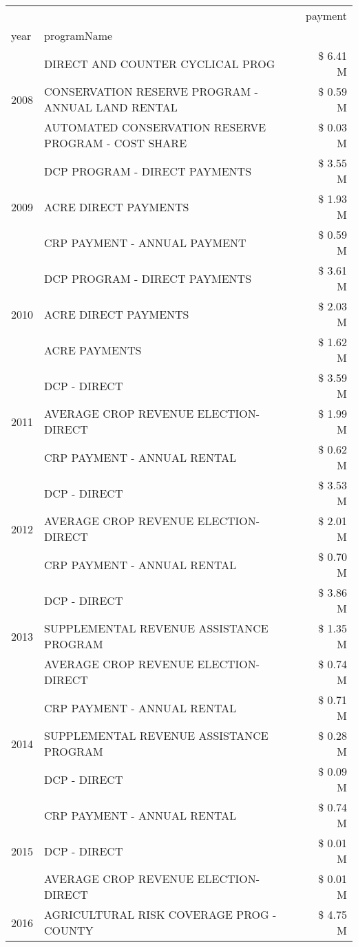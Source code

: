\begin{tabular}{llr}
\toprule
 &  & payment \\
year & programName &  \\
\midrule
\multirow[t]{3}{*}{2008} & DIRECT AND COUNTER CYCLICAL PROG & \$ 6.41 M \\
 & CONSERVATION RESERVE PROGRAM - ANNUAL LAND RENTAL & \$ 0.59 M \\
 & AUTOMATED CONSERVATION RESERVE PROGRAM - COST SHARE & \$ 0.03 M \\
\cline{1-3}
\multirow[t]{3}{*}{2009} & DCP PROGRAM - DIRECT PAYMENTS & \$ 3.55 M \\
 & ACRE DIRECT PAYMENTS & \$ 1.93 M \\
 & CRP PAYMENT - ANNUAL PAYMENT & \$ 0.59 M \\
\cline{1-3}
\multirow[t]{3}{*}{2010} & DCP PROGRAM - DIRECT PAYMENTS & \$ 3.61 M \\
 & ACRE DIRECT PAYMENTS & \$ 2.03 M \\
 & ACRE PAYMENTS & \$ 1.62 M \\
\cline{1-3}
\multirow[t]{3}{*}{2011} & DCP - DIRECT & \$ 3.59 M \\
 & AVERAGE CROP REVENUE ELECTION-DIRECT & \$ 1.99 M \\
 & CRP PAYMENT - ANNUAL RENTAL & \$ 0.62 M \\
\cline{1-3}
\multirow[t]{3}{*}{2012} & DCP - DIRECT & \$ 3.53 M \\
 & AVERAGE CROP REVENUE ELECTION-DIRECT & \$ 2.01 M \\
 & CRP PAYMENT - ANNUAL RENTAL & \$ 0.70 M \\
\cline{1-3}
\multirow[t]{3}{*}{2013} & DCP - DIRECT & \$ 3.86 M \\
 & SUPPLEMENTAL REVENUE ASSISTANCE PROGRAM & \$ 1.35 M \\
 & AVERAGE CROP REVENUE ELECTION-DIRECT & \$ 0.74 M \\
\cline{1-3}
\multirow[t]{3}{*}{2014} & CRP PAYMENT - ANNUAL RENTAL & \$ 0.71 M \\
 & SUPPLEMENTAL REVENUE ASSISTANCE PROGRAM & \$ 0.28 M \\
 & DCP - DIRECT & \$ 0.09 M \\
\cline{1-3}
\multirow[t]{3}{*}{2015} & CRP PAYMENT - ANNUAL RENTAL & \$ 0.74 M \\
 & DCP - DIRECT & \$ 0.01 M \\
 & AVERAGE CROP REVENUE ELECTION-DIRECT & \$ 0.01 M \\
\cline{1-3}
\multirow[t]{3}{*}{2016} & AGRICULTURAL RISK COVERAGE PROG - COUNTY      & \$ 4.75 M \\

\end{tabular}
